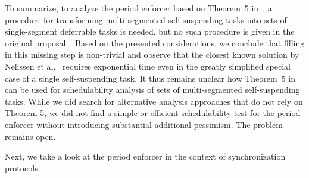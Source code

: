 To summarize, to analyze the period enforcer based on Theorem~5 in~\cite{Raj:suspension1991}, a procedure for transforming multi-segmented self-suspending tasks into sets of single-segment deferrable tasks is needed, but no such procedure is given in the original proposal~\cite{Raj:suspension1991}.
%
Based on the presented considerations, we conclude that filling in this missing step is non-trivial and observe that the closest known solution by Nelissen et al.~\cite{ecrts15nelissen} requires exponential time even in the greatly simplified special case of a single self-suspending task. It thus remains unclear how Theorem~5 in~\cite{Raj:suspension1991} can be used for schedulability analysis of sets of multi-segmented self-suspending tasks. 
While we did search for alternative analysis approaches that do not rely on Theorem 5, we did not find a simple or efficient schedulability test for the period enforcer without introducing substantial additional pessimism.  The problem remains open. 

Next, we take a look at the period enforcer in the context of synchronization protocols.




